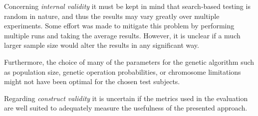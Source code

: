 Concerning \emph{internal validity} it must be kept in mind that search-based testing is random in nature, and
thus the results may vary greatly over multiple experiments. Some effort was made to mitigate this problem by
performing multiple runs and taking the average results. However, it is unclear if a much larger sample size
would alter the results in any significant way.

Furthermore, the choice of many of the parameters for the genetic algorithm such as population size,
genetic operation probabilities, or chromosome limitations might not have been optimal for the chosen test
subjects.

Regarding \emph{construct validity} it is uncertain if the metrics used in the evaluation are well suited
to adequately measure the usefulness of the presented approach.
 
